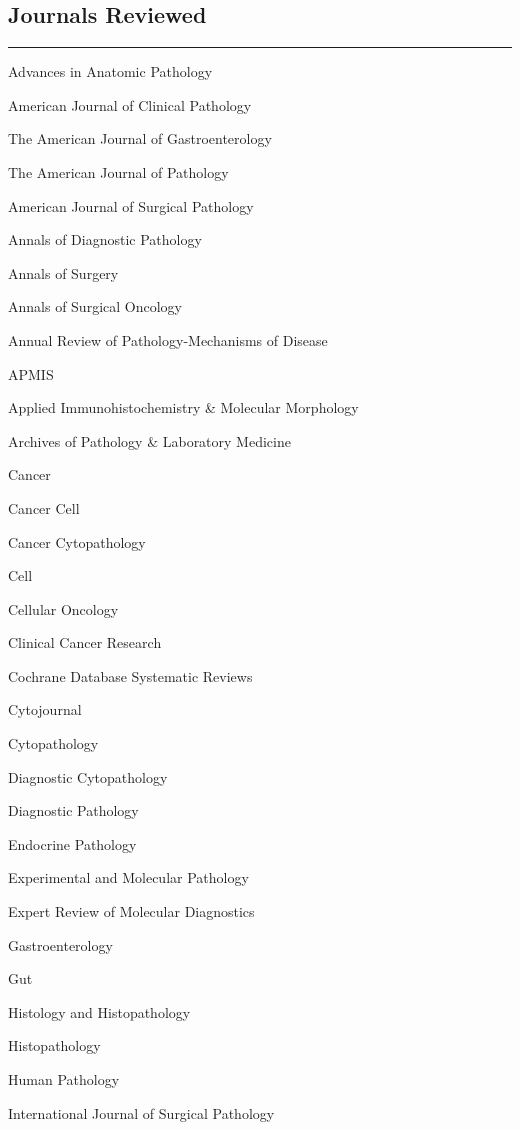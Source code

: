 \documentclass[]{article}
\begin{document}
\pagebreak

\hypertarget{journals-reviewed}{%
\subsection{Journals Reviewed}\label{journals-reviewed}}

\begin{center}\rule{0.5\linewidth}{\linethickness}\end{center}

Advances in Anatomic Pathology

American Journal of Clinical Pathology

The American Journal of Gastroenterology

The American Journal of Pathology

American Journal of Surgical Pathology

Annals of Diagnostic Pathology

Annals of Surgery

Annals of Surgical Oncology

Annual Review of Pathology-Mechanisms of Disease

APMIS

Applied Immunohistochemistry \& Molecular Morphology

Archives of Pathology \& Laboratory Medicine

Cancer

Cancer Cell

Cancer Cytopathology

Cell

Cellular Oncology

Clinical Cancer Research

Cochrane Database Systematic Reviews

Cytojournal

Cytopathology

Diagnostic Cytopathology

Diagnostic Pathology

Endocrine Pathology

Experimental and Molecular Pathology

Expert Review of Molecular Diagnostics

Gastroenterology

Gut

Histology and Histopathology

Histopathology

Human Pathology

International Journal of Surgical Pathology
\end{document}
